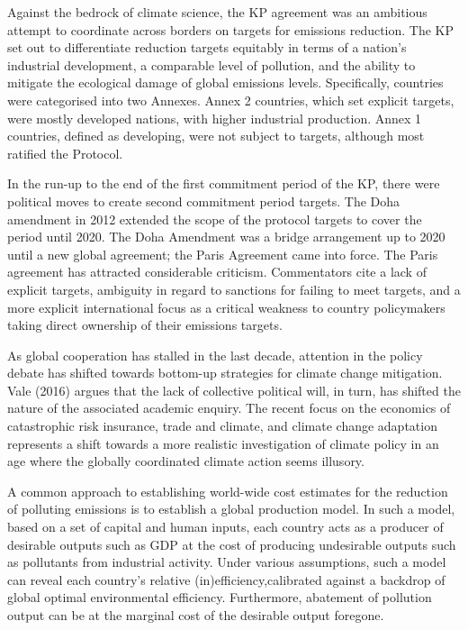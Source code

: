 \documentclass[
  letterpaper,
  DIV=11,
  numbers=noendperiod]{scrartcl}
\begin{document}
Against the bedrock of climate science, the KP agreement was an
ambitious attempt to coordinate across borders on targets for emissions
reduction. The KP set out to differentiate reduction targets equitably
in terms of a nation's industrial development, a comparable level of
pollution, and the ability to mitigate the ecological damage of global
emissions levels. Specifically, countries were categorised into two
Annexes. Annex 2 countries, which set explicit targets, were mostly
developed nations, with higher industrial production. Annex 1 countries,
defined as developing, were not subject to targets, although most
ratified the Protocol.

In the run-up to the end of the first commitment period of the KP, there
were political moves to create second commitment period targets. The
Doha amendment in 2012 extended the scope of the protocol targets to
cover the period until 2020. The Doha Amendment was a bridge arrangement
up to 2020 until a new global agreement; the Paris Agreement came into
force. The Paris agreement has attracted considerable criticism.
Commentators cite a lack of explicit targets, ambiguity in regard to
sanctions for failing to meet targets, and a more explicit international
focus as a critical weakness to country policymakers taking direct
ownership of their emissions targets.

As global cooperation has stalled in the last decade, attention in the
policy debate has shifted towards bottom-up strategies for climate
change mitigation. Vale (2016) argues that the lack of collective
political will, in turn, has shifted the nature of the associated
academic enquiry. The recent focus on the economics of catastrophic risk
insurance, trade and climate, and climate change adaptation represents a
shift towards a more realistic investigation of climate policy in an age
where the globally coordinated climate action seems illusory.

A common approach to establishing world-wide cost estimates for the
reduction of polluting emissions is to establish a global production
model. In such a model, based on a set of capital and human inputs, each
country acts as a producer of desirable outputs such as GDP at the cost
of producing undesirable outputs such as pollutants from industrial
activity. Under various assumptions, such a model can reveal each
country's relative (in)efficiency,calibrated against a backdrop of
global optimal environmental efficiency. Furthermore, abatement of
pollution output can be at the marginal cost of the desirable output
foregone.
\end{document}

